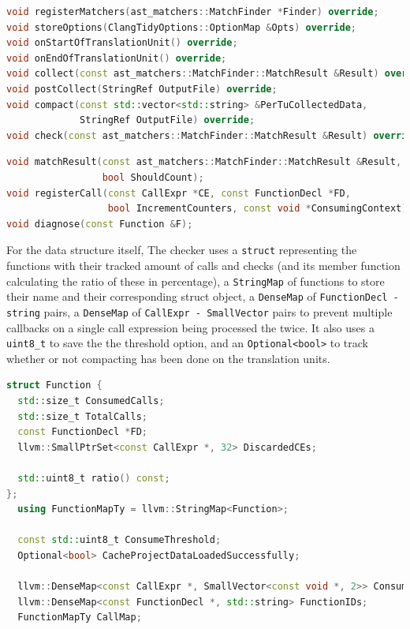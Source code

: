 \begin{lstlisting}[language={C++},caption={Overridden virtual functions in DiscardedReturnValueCheck's header.},label={lst:override-header}]
void registerMatchers(ast_matchers::MatchFinder *Finder) override;
void storeOptions(ClangTidyOptions::OptionMap &Opts) override;
void onStartOfTranslationUnit() override;
void onEndOfTranslationUnit() override;
void collect(const ast_matchers::MatchFinder::MatchResult &Result) override;
void postCollect(StringRef OutputFile) override;
void compact(const std::vector<std::string> &PerTuCollectedData,
			 StringRef OutputFile) override;
void check(const ast_matchers::MatchFinder::MatchResult &Result) override;
\end{lstlisting}

\begin{lstlisting}[language={C++},caption={Private member functions in DiscardedReturnValueCheck's header.},label={lst:drv-member}]
void matchResult(const ast_matchers::MatchFinder::MatchResult &Result,
                 bool ShouldCount);
void registerCall(const CallExpr *CE, const FunctionDecl *FD,
                  bool IncrementCounters, const void *ConsumingContext);
void diagnose(const Function &F);
\end{lstlisting}

For the data structure itself, The checker uses a \lstinline{struct} representing the functions with their tracked amount of calls and
checks (and its member function calculating the ratio of these in percentage), a \lstinline{StringMap} of functions to store their
name and their corresponding struct object, a \lstinline{DenseMap} of \lstinline{FunctionDecl - string} pairs, a
\lstinline{DenseMap} of \lstinline{CallExpr - SmallVector} pairs to prevent multiple callbacks on a single call expression
being processed the twice. It also uses a \lstinline{uint8_t} to save the the threshold option, and an \lstinline{Optional<bool>} to
track whether or not compacting has been done on the translation units.

\begin{lstlisting}[language={C++},caption={Members of the data structure.},label={lst:remaining-members}]
struct Function {
  std::size_t ConsumedCalls;
  std::size_t TotalCalls;
  const FunctionDecl *FD;
  llvm::SmallPtrSet<const CallExpr *, 32> DiscardedCEs;
  
  std::uint8_t ratio() const;
};
  using FunctionMapTy = llvm::StringMap<Function>;

  const std::uint8_t ConsumeThreshold;
  Optional<bool> CacheProjectDataLoadedSuccessfully;

  llvm::DenseMap<const CallExpr *, SmallVector<const void *, 2>> ConsumedCalls;
  llvm::DenseMap<const FunctionDecl *, std::string> FunctionIDs;
  FunctionMapTy CallMap;
\end{lstlisting}

